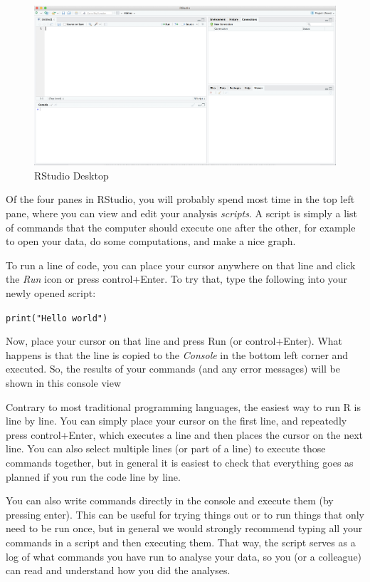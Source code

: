 \begin{figure}
\centering
\includegraphics[width=0.9\linewidth]{figures/ch3_r_studio}
\caption{RStudio Desktop}
\label{fig:rstudio}
\end{figure}

Of the four panes in RStudio,
you will probably spend most time in the top left pane, where you can view and edit your analysis \emph{scripts}.
A script is simply a list of commands that the computer should execute one after the other,
for example to open your data, do some computations, and make a nice graph. 

To run a line of code, you can place your cursor anywhere on that line and click the \emph{Run} icon or
press control+Enter.
To try that, type the following into your newly opened script:

\verb|print("Hello world")|

Now, place your cursor on that line and press Run (or control+Enter).
What happens is that the line is copied to the \emph{Console} in the bottom left corner
and executed.
So, the results of your commands (and any error messages) will be shown in this console view

Contrary to most traditional programming languages,
the easiest way to run R is line by line.
You can simply place your cursor on the first line,
and repeatedly press control+Enter, which executes a line and then places the cursor on the next line.
You can also select multiple lines (or part of a line) to execute those commands together,
but in general it is easiest to check that everything goes as planned if you run the code line by line.

You can also write commands directly in the console and execute them (by pressing enter).
This can be useful for trying things out or to run things that only need to be run once,
but in general we would strongly recommend typing all your commands in a script and then executing them.
That way, the script serves as a log of what commands you have run to analyse your data,
so you (or a colleague) can read and understand how you did the analyses. 

